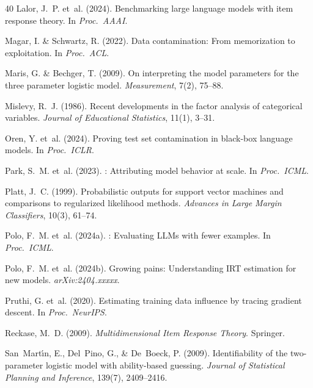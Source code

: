 \documentclass[11pt,a4paper]{article}
\begin{document}
\begin{thebibliography}{40}
Lalor, J.~P. et~al. (2024).
\newblock Benchmarking large language models with item response theory.
\newblock In \emph{Proc.\ AAAI}.

Magar, I. \& Schwartz, R. (2022).
\newblock Data contamination: From memorization to exploitation.
\newblock In \emph{Proc.\ ACL}.

Maris, G. \& Bechger, T. (2009).
\newblock On interpreting the model parameters for the three parameter logistic model.
\newblock \emph{Measurement}, 7(2), 75--88.

Mislevy, R.~J. (1986).
\newblock Recent developments in the factor analysis of categorical variables.
\newblock \emph{Journal of Educational Statistics}, 11(1), 3--31.

Oren, Y. et~al. (2024).
\newblock Proving test set contamination in black-box language models.
\newblock In \emph{Proc.\ ICLR}.

Park, S.~M. et~al. (2023).
: Attributing model behavior at scale.
\newblock In \emph{Proc.\ ICML}.

Platt, J.~C. (1999).
\newblock Probabilistic outputs for support vector machines and comparisons to regularized likelihood methods.
\newblock \emph{Advances in Large Margin Classifiers}, 10(3), 61--74.

Polo, F.~M. et~al. (2024a).
: Evaluating {LLMs} with fewer examples.
\newblock In \emph{Proc.\ ICML}.

Polo, F.~M. et~al. (2024b).
\newblock Growing pains: Understanding {IRT} estimation for new models.
\newblock \emph{arXiv:2404.xxxxx}.

Pruthi, G. et~al. (2020).
\newblock Estimating training data influence by tracing gradient descent.
\newblock In \emph{Proc.\ NeurIPS}.

Reckase, M.~D. (2009).
\newblock \emph{Multidimensional Item Response Theory}.
\newblock Springer.

San~Mart{\'\i}n, E., Del~Pino, G., \& De~Boeck, P. (2009).
\newblock Identifiability of the two-parameter logistic model with ability-based guessing.
\newblock \emph{Journal of Statistical Planning and Inference}, 139(7), 2409--2416.


\end{thebibliography}
\end{document}
